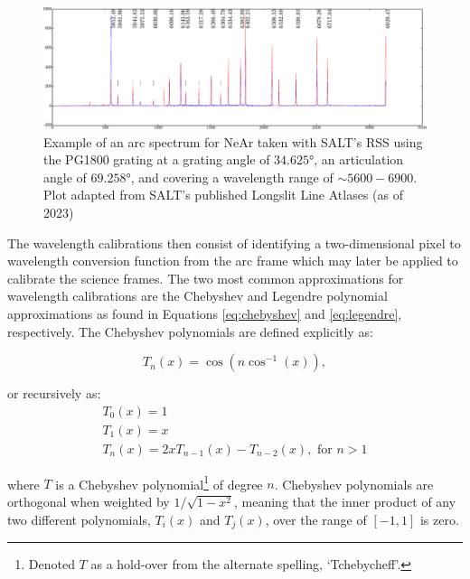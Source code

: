 \begin{figure}[t]
    \centering
    \includegraphics[width = 16cm]{figures/2_Ne_arc.pdf}
    \caption{Example of an arc spectrum for NeAr taken with \gls{SALT}'s \gls{RSS} using the PG1800 grating at a grating angle of $34.625$°, an articulation angle of $69.258$°, and covering a wavelength range of $\sim5600 - 6900$\angstrom. Plot adapted from \gls{SALT}'s published Longslit Line Atlases (as of 2023)\protect\footnotemark}
    \label{fig:Ne_arc}
\end{figure}

The wavelength calibrations then consist of identifying a two-dimensional pixel to wavelength conversion function from the arc frame which may later be applied to calibrate the science frames. The two most common approximations for wavelength calibrations are the Chebyshev and Legendre polynomial approximations as found in Equations \ref{eq:chebyshev} and \ref{eq:legendre}, respectively. The Chebyshev polynomials are defined explicitly as:

\begin{equation}
    T_{n}(x) = \cos(n \cos^{-1}(x)),
    \label{eq:chebypolyexplicit}
\end{equation}

\noindent or recursively as:
\begin{equation}
    \begin{gathered}
        T_{0}(x) = 1 \\
        T_{1}(x) = x  \\
        T_{n}(x) = 2 x T_{n - 1}(x) - T_{n - 2}(x), \text{ for } n > 1
    \end{gathered}
    \label{eq:chebypoly}
\end{equation}

\noindent where $T$ is a Chebyshev polynomial\footnote{Denoted $T$ as a hold-over from the alternate spelling, `Tchebycheff'.} of degree $n$. Chebyshev polynomials are orthogonal when weighted by $1 / \sqrt{1 - x^{2}}$, meaning that the inner product of any two different polynomials, $T_{i}(x)$ and $T_{j}(x)$, over the range of $[-1, 1]$ is zero.

